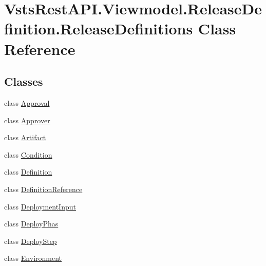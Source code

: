 \hypertarget{class_vsts_rest_a_p_i_1_1_viewmodel_1_1_release_definition_1_1_release_definitions}{}\section{Vsts\+Rest\+A\+P\+I.\+Viewmodel.\+Release\+Definition.\+Release\+Definitions Class Reference}
\label{class_vsts_rest_a_p_i_1_1_viewmodel_1_1_release_definition_1_1_release_definitions}
\subsection*{Classes}
\begin{DoxyCompactItemize}
\item 
class \mbox{\hyperlink{class_vsts_rest_a_p_i_1_1_viewmodel_1_1_release_definition_1_1_release_definitions_1_1_approval}{Approval}}
\item 
class \mbox{\hyperlink{class_vsts_rest_a_p_i_1_1_viewmodel_1_1_release_definition_1_1_release_definitions_1_1_approver}{Approver}}
\item 
class \mbox{\hyperlink{class_vsts_rest_a_p_i_1_1_viewmodel_1_1_release_definition_1_1_release_definitions_1_1_artifact}{Artifact}}
\item 
class \mbox{\hyperlink{class_vsts_rest_a_p_i_1_1_viewmodel_1_1_release_definition_1_1_release_definitions_1_1_condition}{Condition}}
\item 
class \mbox{\hyperlink{class_vsts_rest_a_p_i_1_1_viewmodel_1_1_release_definition_1_1_release_definitions_1_1_definition}{Definition}}
\item 
class \mbox{\hyperlink{class_vsts_rest_a_p_i_1_1_viewmodel_1_1_release_definition_1_1_release_definitions_1_1_definition_reference}{Definition\+Reference}}
\item 
class \mbox{\hyperlink{class_vsts_rest_a_p_i_1_1_viewmodel_1_1_release_definition_1_1_release_definitions_1_1_deployment_input}{Deployment\+Input}}
\item 
class \mbox{\hyperlink{class_vsts_rest_a_p_i_1_1_viewmodel_1_1_release_definition_1_1_release_definitions_1_1_deploy_phas}{Deploy\+Phas}}
\item 
class \mbox{\hyperlink{class_vsts_rest_a_p_i_1_1_viewmodel_1_1_release_definition_1_1_release_definitions_1_1_deploy_step}{Deploy\+Step}}
\item 
class \mbox{\hyperlink{class_vsts_rest_a_p_i_1_1_viewmodel_1_1_release_definition_1_1_release_definitions_1_1_environment}{Environment}}

\end{DoxyCompactItemize}
